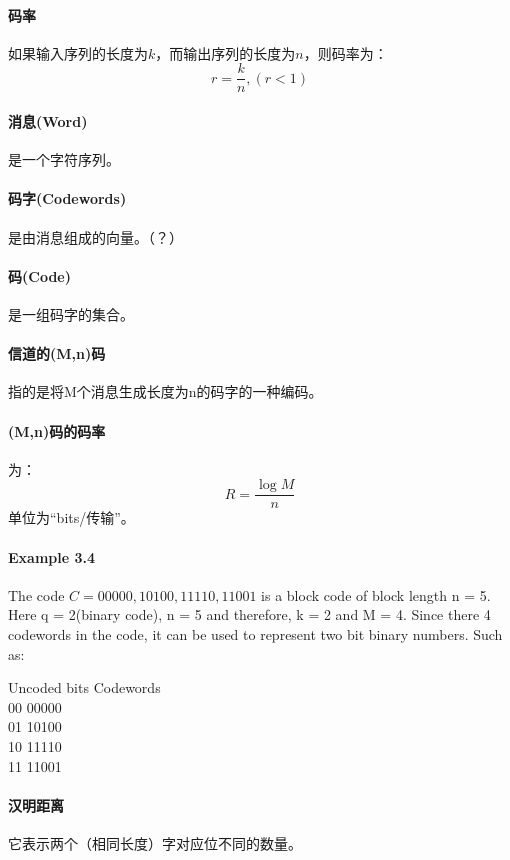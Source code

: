\documentclass[10pt,letterpaper]{article}
\begin{document}
\paragraph{码率} 如果输入序列的长度为$k$，而输出序列的长度为$n$，则码率为：
\begin{equation}
	r=\frac{k}{n},(r<1)
\end{equation}

\paragraph{消息(Word)}是一个字符序列。
\paragraph{码字(Codewords)} 是由消息组成的向量。（？）
\paragraph{码(Code)} 是一组码字的集合。
\paragraph{信道的(M,n)码}指的是将M个消息生成长度为n的码字的一种编码。
\paragraph{(M,n)码的码率} 为：
\begin{equation}
	R=\frac{\log M}{n}
\end{equation}
单位为“bits/传输”。
\paragraph{Example 3.4}  The code $C = {00000, 10100, 11110, 11001}$ is a block code of block length n = 5. Here q = 2(binary code), n = 5 and therefore, k = 2 and M = 4. Since there 4 codewords in the code, it can be used to represent two bit binary numbers. Such as:
\begin{center}
	Uncoded bits	Codewords \\
	    00  		00000 \\
		01			10100 \\
		10			11110 \\
		11			11001
\end{center}
\paragraph{汉明距离} 它表示两个（相同长度）字对应位不同的数量。
\end{document}
